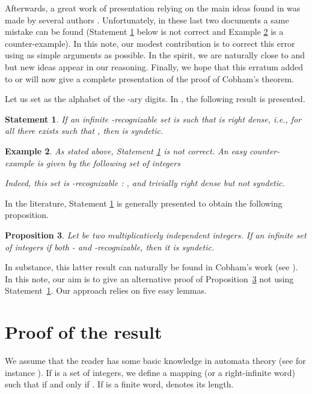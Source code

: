 \documentclass{beatcs}
\newtheorem{proposition}{Proposition}
\newtheorem{example}[proposition]{Example}
\newtheorem{sta}[proposition]{Statement}
\begin{document}
Afterwards, a great work of presentation relying on the main ideas
found in \cite{Ha1} was made by several authors \cite{AS,Pe}.
Unfortunately, in these last two documents a same mistake can be found
(Statement \ref{lem:faux} below is not correct and
Example \ref{exa:c} is a counter-example). In this note, our modest
contribution is to correct this error using as simple arguments as
possible. In the spirit, we are naturally close to \cite{Co} and
\cite{Ha1} but new ideas appear in our reasoning.  Finally, we hope
that this erratum added to \cite{Pe} or \cite{AS} will now give a
complete presentation of the proof of Cobham's theorem.

Let us set  as the alphabet of the -ary
digits. In \cite{AS,Pe}, the following result is presented.
\begin{sta}\label{lem:faux}
  If an infinite -recognizable set  is such
  that  is right dense, i.e., for all 
  there exists  such that , then
   is syndetic.
\end{sta}

\begin{example}\label{exa:c}
  As stated above, Statement \ref{lem:faux} is not correct.  An easy
  counter-example is given by the following set  of integers
  
  Indeed, this set is
  -recognizable : , and trivially
  right dense but not syndetic.
\end{example}
In the literature, Statement \ref{lem:faux} is generally presented to
obtain the following proposition.

\begin{proposition}\label{pro:1}\cite[Prop. 5]{Ha1}
  Let  be two multiplicatively independent integers. If an
  infinite set of integers if both - and -recognizable, then it
  is syndetic.
\end{proposition}
In substance, this latter result can naturally be found in Cobham's
work (see \cite[Lemma 3]{Co}). In this note, our aim is to give an
alternative proof of Proposition~\ref{pro:1} not using
Statement~\ref{lem:faux}. Our approach relies on five easy lemmas.

\section{Proof of the result}

We assume that the reader has some basic knowledge in automata theory
(see for instance \cite{Ei}). If  is a set of
integers, we define a mapping (or a right-infinite word)
 such that  if
and only if . If  is a finite word,  denotes its length.
\end{document}
